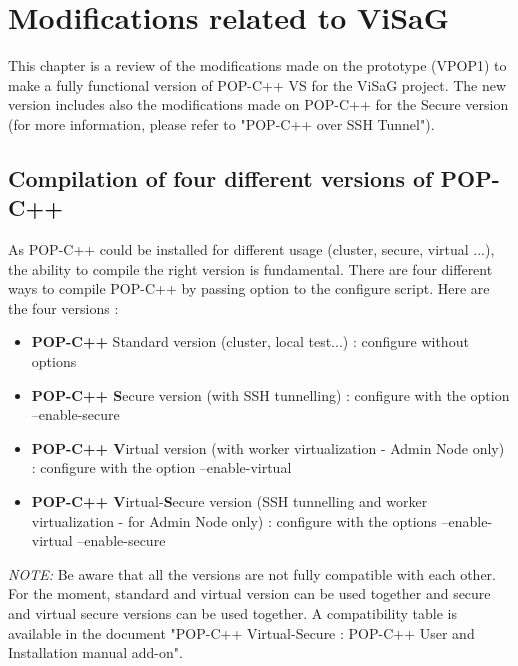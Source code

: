 \section{Modifications related to ViSaG}
\label{sec:modif}
\label{modifications}

This chapter is a review of the modifications made on the prototype (VPOP1) to make a fully functional version of POP-C++ VS for the ViSaG project. The new version includes also the modifications made on POP-C++ for the Secure version (for more information, please refer to "POP-C++ over SSH Tunnel"\cite{popcssh}).

\subsection{Compilation of four different versions of POP-C++}
As POP-C++ could be installed for different usage (cluster, secure, virtual ...), the ability to compile the right version is fundamental. There are four different ways to compile POP-C++ by passing option to the configure script. Here are the four versions : 

\begin{itemize}
\item \textbf{POP-C++} Standard version (cluster, local test...) : configure without options
\item \textbf{POP-C++ S}ecure version (with SSH tunnelling) : configure with the option --enable-secure
\item \textbf{POP-C++ V}irtual version (with worker virtualization - Admin Node only) : configure with the option --enable-virtual
\item \textbf{POP-C++ V}irtual-\textbf{S}ecure version (SSH tunnelling and worker virtualization - for Admin Node only) : configure with the options --enable-virtual --enable-secure
\end{itemize}

\textit{NOTE:} Be aware that all the versions are not fully compatible with each other. For the moment, standard and virtual version can be used together and secure and virtual secure versions can be used together. A compatibility table is available in the document "POP-C++ Virtual-Secure : POP-C++ User and Installation manual add-on"\cite{popc_vs_addon_manual}.\s

